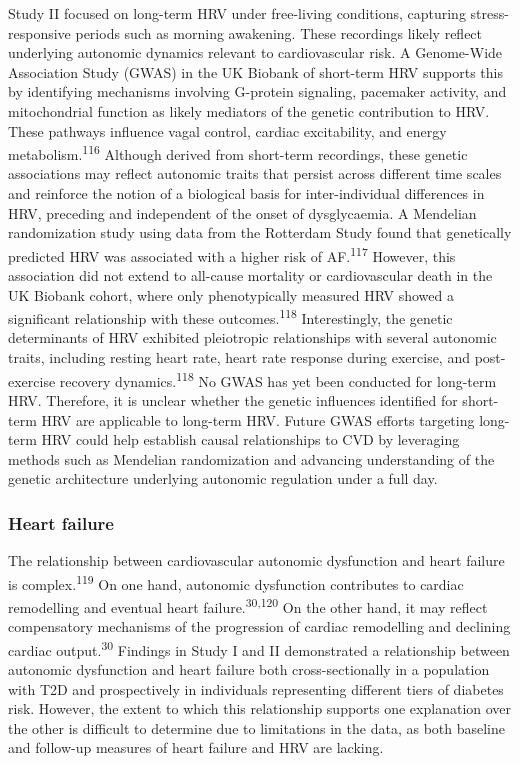 \documentclass[
  a4paper,
  headsepline=true,
  open=left]{scrbook}
\begin{document}
Study II focused on long-term HRV under free-living conditions,
capturing stress-responsive periods such as morning awakening. These
recordings likely reflect underlying autonomic dynamics relevant to
cardiovascular risk. A Genome-Wide Association Study (GWAS) in the UK
Biobank of short-term HRV supports this by identifying mechanisms
involving G-protein signaling, pacemaker activity, and mitochondrial
function as likely mediators of the genetic contribution to HRV. These
pathways influence vagal control, cardiac excitability, and energy
metabolism.\textsuperscript{116} Although derived from short-term
recordings, these genetic associations may reflect autonomic traits that
persist across different time scales and reinforce the notion of a
biological basis for inter-individual differences in HRV, preceding and
independent of the onset of dysglycaemia. A Mendelian randomization
study using data from the Rotterdam Study found that genetically
predicted HRV was associated with a higher risk of
AF.\textsuperscript{117} However, this association did not extend to
all-cause mortality or cardiovascular death in the UK Biobank cohort,
where only phenotypically measured HRV showed a significant relationship
with these outcomes.\textsuperscript{118} Interestingly, the genetic
determinants of HRV exhibited pleiotropic relationships with several
autonomic traits, including resting heart rate, heart rate response
during exercise, and post-exercise recovery
dynamics.\textsuperscript{118} No GWAS has yet been conducted for
long-term HRV. Therefore, it is unclear whether the genetic influences
identified for short-term HRV are applicable to long-term HRV. Future
GWAS efforts targeting long-term HRV could help establish causal
relationships to CVD by leveraging methods such as Mendelian
randomization and advancing understanding of the genetic architecture
underlying autonomic regulation under a full day.

\hypertarget{heart-failure-1}{%
\subsubsection{Heart failure}\label{heart-failure-1}}

The relationship between cardiovascular autonomic dysfunction and heart
failure is complex.\textsuperscript{119} On one hand, autonomic
dysfunction contributes to cardiac remodelling and eventual heart
failure.\textsuperscript{30,120} On the other hand, it may reflect
compensatory mechanisms of the progression of cardiac remodelling and
declining cardiac output.\textsuperscript{30} Findings in Study I and II
demonstrated a relationship between autonomic dysfunction and heart
failure both cross-sectionally in a population with T2D and
prospectively in individuals representing different tiers of diabetes
risk. However, the extent to which this relationship supports one
explanation over the other is difficult to determine due to limitations
in the data, as both baseline and follow-up measures of heart failure
and HRV are lacking.
\end{document}
